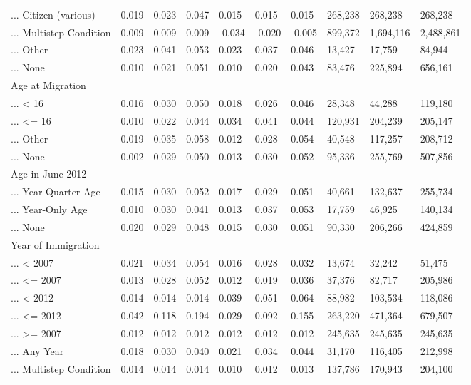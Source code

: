\documentclass[
  letterpaper,
  DIV=11,
  numbers=noendperiod]{scrartcl}
\begin{document}
\begin{table}[!htbp]
{\begin{tabular}{llllllllll}
... Citizen (various) & 0.019 & 0.023 & 0.047 & 0.015 & 0.015 & 0.015 & 268,238 & 268,238 & 268,238 \\ 
... Multistep Condition & 0.009 & 0.009 & 0.009 & -0.034 & -0.020 & -0.005 & 899,372 & 1,694,116 & 2,488,861 \\ 
... Other & 0.023 & 0.041 & 0.053 & 0.023 & 0.037 & 0.046 & 13,427 & 17,759 & 84,944 \\ 
... None & 0.010 & 0.021 & 0.051 & 0.010 & 0.020 & 0.043 & 83,476 & 225,894 & 656,161 \\ 
Age at Migration &  &  &  &  &  &  &  &  &  \\ 
... < 16 & 0.016 & 0.030 & 0.050 & 0.018 & 0.026 & 0.046 & 28,348 & 44,288 & 119,180 \\ 
... <= 16 & 0.010 & 0.022 & 0.044 & 0.034 & 0.041 & 0.044 & 120,931 & 204,239 & 205,147 \\ 
... Other & 0.019 & 0.035 & 0.058 & 0.012 & 0.028 & 0.054 & 40,548 & 117,257 & 208,712 \\ 
... None & 0.002 & 0.029 & 0.050 & 0.013 & 0.030 & 0.052 & 95,336 & 255,769 & 507,856 \\ 
Age in June 2012 &  &  &  &  &  &  &  &  &  \\ 
... Year-Quarter Age & 0.015 & 0.030 & 0.052 & 0.017 & 0.029 & 0.051 & 40,661 & 132,637 & 255,734 \\ 
... Year-Only Age & 0.010 & 0.030 & 0.041 & 0.013 & 0.037 & 0.053 & 17,759 & 46,925 & 140,134 \\ 
... None & 0.020 & 0.029 & 0.048 & 0.015 & 0.030 & 0.051 & 90,330 & 206,266 & 424,859 \\ 
Year of Immigration &  &  &  &  &  &  &  &  &  \\ 
... < 2007 & 0.021 & 0.034 & 0.054 & 0.016 & 0.028 & 0.032 & 13,674 & 32,242 & 51,475 \\ 
... <= 2007 & 0.013 & 0.028 & 0.052 & 0.012 & 0.019 & 0.036 & 37,376 & 82,717 & 205,986 \\ 
... < 2012 & 0.014 & 0.014 & 0.014 & 0.039 & 0.051 & 0.064 & 88,982 & 103,534 & 118,086 \\ 
... <= 2012 & 0.042 & 0.118 & 0.194 & 0.029 & 0.092 & 0.155 & 263,220 & 471,364 & 679,507 \\ 
... >= 2007 & 0.012 & 0.012 & 0.012 & 0.012 & 0.012 & 0.012 & 245,635 & 245,635 & 245,635 \\ 
... Any Year & 0.018 & 0.030 & 0.040 & 0.021 & 0.034 & 0.044 & 31,170 & 116,405 & 212,998 \\ 
... Multistep Condition & 0.014 & 0.014 & 0.014 & 0.010 & 0.012 & 0.013 & 137,786 & 170,943 & 204,100 \\ 

\end{tabular}}
\end{table}
\end{document}
